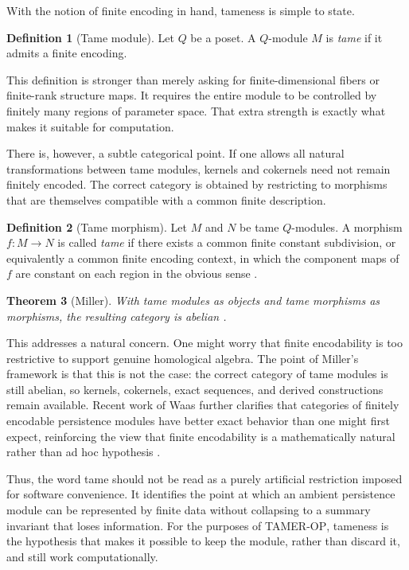 \documentclass[11pt]{article}
\newcommand{\TAMER}{\textsc{TAMER-OP}}
\newtheorem{theorem}{Theorem}
\theoremstyle{definition}
\newtheorem{defn}[theorem]{Definition}
\theoremstyle{remark}
\begin{document}
With the notion of finite encoding in hand, tameness is simple to state.

\begin{defn}[Tame module]
Let $Q$ be a poset. A $Q$-module $M$ is \emph{tame} if it admits a finite encoding.
\end{defn}

This definition is stronger than merely asking for finite-dimensional fibers or finite-rank structure maps. It requires the entire module to be controlled by finitely many regions of parameter space. That extra strength is exactly what makes it suitable for computation.

There is, however, a subtle categorical point. If one allows all natural transformations between tame modules, kernels and cokernels need not remain finitely encoded. The correct category is obtained by restricting to morphisms that are themselves compatible with a common finite description.

\begin{defn}[Tame morphism]
Let $M$ and $N$ be tame $Q$-modules. A morphism $f : M \to N$ is called \emph{tame} if there exists a common finite constant subdivision, or equivalently a common finite encoding context, in which the component maps of $f$ are constant on each region in the obvious sense \cite{Mil20}.
\end{defn}

\begin{theorem}[Miller]
With tame modules as objects and tame morphisms as morphisms, the resulting category is abelian \cite{Mil20}.
\end{theorem}

This addresses a natural concern. One might worry that finite encodability is too restrictive to support genuine homological algebra. The point of Miller's framework is that this is not the case: the correct category of tame modules is still abelian, so kernels, cokernels, exact sequences, and derived constructions remain available. Recent work of Waas further clarifies that categories of finitely encodable persistence modules have better exact behavior than one might first expect, reinforcing the view that finite encodability is a mathematically natural rather than ad hoc hypothesis \cite{Waa24}.

Thus, the word tame should not be read as a purely artificial restriction imposed for software convenience. It identifies the point at which an ambient persistence module can be represented by finite data without collapsing to a summary invariant that loses information. For the purposes of \TAMER{}, tameness is the hypothesis that makes it possible to keep the module, rather than discard it, and still work computationally. 
\end{document}
